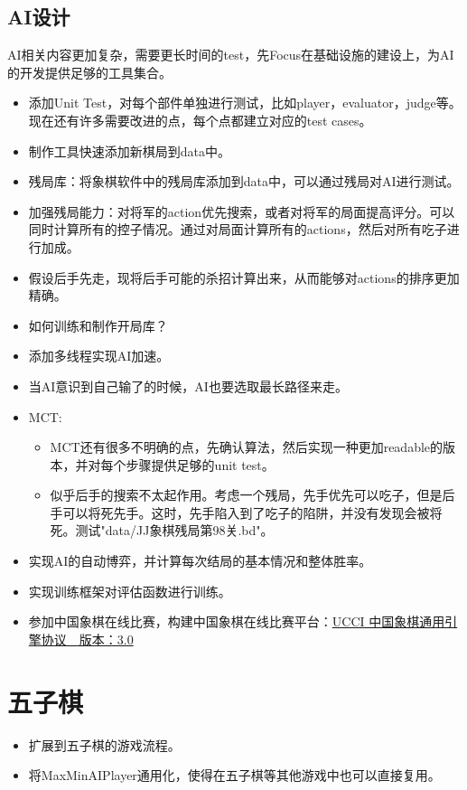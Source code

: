 \documentclass[export, 12pt, letterpaper]{ctexrep}
\begin{document}
\subsection{AI设计}

AI相关内容更加复杂，需要更长时间的test，先Focus在基础设施的建设上，为AI的开发提供足够的工具集合。


\begin{itemize}
\item{ 添加Unit Test，对每个部件单独进行测试，比如player，evaluator，judge等。现在还有许多需要改进的点，每个点都建立对应的test cases。 }
\item{ 制作工具快速添加新棋局到data中。 }
\item{ 残局库：将象棋软件中的残局库添加到data中，可以通过残局对AI进行测试。 }
\item{ 加强残局能力：对将军的action优先搜索，或者对将军的局面提高评分。可以同时计算所有的控子情况。通过对局面计算所有的actions，然后对所有吃子进行加成。 }
\item{ 假设后手先走，现将后手可能的杀招计算出来，从而能够对actions的排序更加精确。 }
\item{ 如何训练和制作开局库？ }
\item{ 添加多线程实现AI加速。 }
\item{ 当AI意识到自己输了的时候，AI也要选取最长路径来走。 }
\item{ MCT:
\begin{itemize}
\item{ MCT还有很多不明确的点，先确认算法，然后实现一种更加readable的版本，并对每个步骤提供足够的unit test。 }
\item{ 似乎后手的搜索不太起作用。考虑一个残局，先手优先可以吃子，但是后手可以将死先手。这时，先手陷入到了吃子的陷阱，并没有发现会被将死。测试"data/JJ象棋残局第98关.bd"。 }
\end{itemize}
 }
\item{ 实现AI的自动博弈，并计算每次结局的基本情况和整体胜率。 }
\item{ 实现训练框架对评估函数进行训练。 }
\item{ 参加中国象棋在线比赛，构建中国象棋在线比赛平台：\href{https://www.xqbase.com/protocol/cchess_ucci.htm}{UCCI 中国象棋通用引擎协议　版本：3.0} }
\end{itemize}



\section{五子棋}


\begin{itemize}
\item{ 扩展到五子棋的游戏流程。 }
\item{ 将MaxMinAIPlayer通用化，使得在五子棋等其他游戏中也可以直接复用。 }
\end{itemize}
\end{document}
